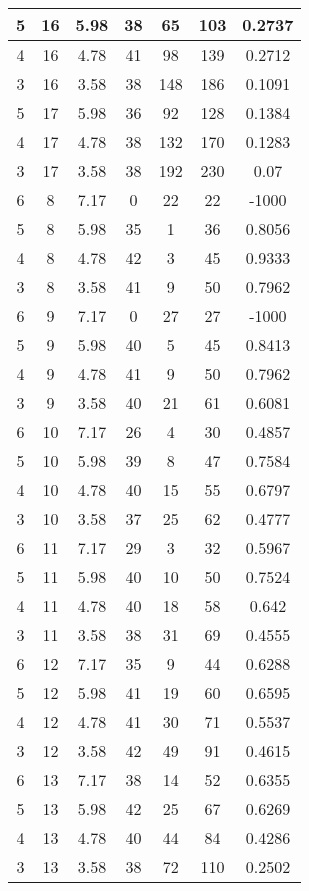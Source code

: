 \documentclass[letterpaper, 12pt]{article}
\begin{document}
\begin{longtable}{|c|c|c|c|c|c|c|}
\hline
5 & 16 & 5.98 & 38 & 65 & 103 & 0.2737 \\
\hline
4 & 16 & 4.78 & 41 & 98 & 139 & 0.2712 \\
\hline
3 & 16 & 3.58 & 38 & 148 & 186 & 0.1091 \\
\hline
5 & 17 & 5.98 & 36 & 92 & 128 & 0.1384 \\
\hline
4 & 17 & 4.78 & 38 & 132 & 170 & 0.1283 \\
\hline
3 & 17 & 3.58 & 38 & 192 & 230 & 0.07 \\
\hline
6 & 8 & 7.17 & 0 & 22 & 22 & -1000 \\
\hline
5 & 8 & 5.98 & 35 & 1 & 36 & 0.8056 \\
\hline
4 & 8 & 4.78 & 42 & 3 & 45 & 0.9333 \\
\hline
3 & 8 & 3.58 & 41 & 9 & 50 & 0.7962 \\
\hline
6 & 9 & 7.17 & 0 & 27 & 27 & -1000 \\
\hline
5 & 9 & 5.98 & 40 & 5 & 45 & 0.8413 \\
\hline
4 & 9 & 4.78 & 41 & 9 & 50 & 0.7962 \\
\hline
3 & 9 & 3.58 & 40 & 21 & 61 & 0.6081 \\
\hline
6 & 10 & 7.17 & 26 & 4 & 30 & 0.4857 \\
\hline
5 & 10 & 5.98 & 39 & 8 & 47 & 0.7584 \\
\hline
4 & 10 & 4.78 & 40 & 15 & 55 & 0.6797 \\
\hline
3 & 10 & 3.58 & 37 & 25 & 62 & 0.4777 \\
\hline
6 & 11 & 7.17 & 29 & 3 & 32 & 0.5967 \\
\hline
5 & 11 & 5.98 & 40 & 10 & 50 & 0.7524 \\
\hline
4 & 11 & 4.78 & 40 & 18 & 58 & 0.642 \\
\hline
3 & 11 & 3.58 & 38 & 31 & 69 & 0.4555 \\
\hline
6 & 12 & 7.17 & 35 & 9 & 44 & 0.6288 \\
\hline
5 & 12 & 5.98 & 41 & 19 & 60 & 0.6595 \\
\hline
4 & 12 & 4.78 & 41 & 30 & 71 & 0.5537 \\
\hline
3 & 12 & 3.58 & 42 & 49 & 91 & 0.4615 \\
\hline
6 & 13 & 7.17 & 38 & 14 & 52 & 0.6355 \\
\hline
5 & 13 & 5.98 & 42 & 25 & 67 & 0.6269 \\
\hline
4 & 13 & 4.78 & 40 & 44 & 84 & 0.4286 \\
\hline
3 & 13 & 3.58 & 38 & 72 & 110 & 0.2502 \\

\end{longtable}
\end{document}
